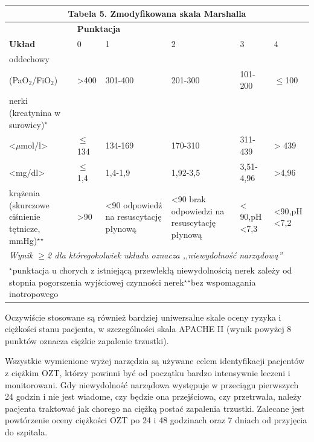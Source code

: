 \documentclass[a4paper, 12pt]{report}
\begin{document}
\begin{table}[!h]
\begin{center}
\begin{footnotesize}
\begin{tabular}{|p{3cm} | p{0.8cm} p{2.4cm} p{2.6cm} p{1.4cm} p{1.3cm}|}
\hline
\multicolumn{6}{|c|}{\cellcolor[gray]{0.9} \textbf{Tabela
  5. Zmodyfikowana skala Marshalla}}\\
\hline \hline
 & \multicolumn{5}{l|}{\textbf{Punktacja}}\\
\cline{2-6}
\textbf{Układ} & 0 & 1 & 2 & 3 & 4\\
\hline
oddechowy & \multicolumn{5}{l|}{}\\
 (PaO$_2$/FiO$_2$) & >400 & 301-400 & 201-300 & 101-200 & $\leq$100\\
\hline
nerki (kreatynina w surowicy)$^\star$ & \multicolumn{5}{l|}{}\\
<$\mu$mol/l> & $\leq$134 & 134-169 & 170-310 & 311-439 & > 439\\
<mg/dl> & $\leq$1,4 & 1,4-1,9 & 1,92-3,5 & 3,51-4,96 & >4,96\\
\hline
krążenia (skurczowe ciśnienie tętnicze, mmHg)$^\star$$^\star$ 
& >90 & <90 odpowiedź na resuscytację płynową 
& <90 brak odpowiedzi na resuscytację płynową 
& < 90,\newline pH <7,3 & <90,\newline pH <7,2\\ 
\hline \hline
\multicolumn{6}{|p{13cm}|}{\textsl{Wynik $\geq$2 dla któregokolwiek układu
  oznacza ,,niewydolność narządową''}}\\
\hline
\multicolumn{6}{|p{13cm}|}{\scriptsize{$^\star$punktacja u chorych z istniejącą przewlekłą
  niewydolnością nerek zależy od stopnia pogorszenia wyjściowej
  czynności nerek\newline $^\star$$^\star$bez wspomagania inotropowego}}\\
\hline
\end{tabular}
\end{footnotesize}
\end{center}
\end{table}

Oczywiście stosowane są również bardziej uniwersalne skale oceny
ryzyka i ciężkości stanu pacjenta, w szczególności skala APACHE II
(wynik powyżej 8 punktów oznacza ciężkie zapalenie trzustki).

Wszystkie wymienione wyżej narzędzia są używane celem identyfikacji
pacjentów z ciężkim OZT, którzy powinni być od początku bardzo
intensywnie leczeni i monitorowani. Gdy niewydolność narządowa
występuje w przeciągu pierwszych 24 godzin i nie jest wiadome, czy
będzie ona przejściowa, czy przetrwała, należy pacjenta traktować jak
chorego na ciężką postać zapalenia trzustki. Zalecane jest powtórzenie
oceny ciężkości OZT po 24 i 48 godzinach oraz 7 dniach od przyjęcia do
szpitala.
\end{document}
